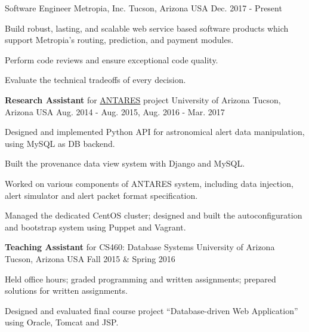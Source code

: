

\begin{cventries}

  \cventry
    {Software Engineer} %
    {Metropia, Inc.} %
    {Tucson, Arizona USA} %
    {Dec. 2017 - Present} %
    {
      \begin{cvitems} %
        \item {Build robust, lasting, and scalable web service based
    software products which support Metropia’s routing,
    prediction, and payment modules.}
       \item {Perform code reviews and ensure exceptional code quality.}
       \item {Evaluate the technical tradeoffs of every decision.}
      \end{cvitems}
    }

  \cventry
    {\textbf{Research Assistant} for \href{https://www.noao.edu/ANTARES/}{ANTARES} project} %
    {University of Arizona} %
    {Tucson, Arizona USA} %
    {Aug. 2014 - Aug. 2015, Aug. 2016 - Mar. 2017} %
    {
      \begin{cvitems} %
      \item {Designed and implemented Python API for astronomical
    alert data manipulation, using MySQL as DB backend.}
      \item {Built the provenance data view system with Django and MySQL.}
      \item {Worked on various components of ANTARES system,
    including data injection, alert simulator and alert packet format specification.}
        \item {Managed the dedicated CentOS cluster; designed and
    built the autoconfiguration and bootstrap 
    system using Puppet and Vagrant.}
      \end{cvitems}
    }

  \cventry
    {\textbf{Teaching Assistant} for CS460: Database Systems}
    {University of Arizona} %
    {Tucson, Arizona USA} %
    {Fall 2015 \& Spring 2016} %
    {
      \begin{cvitems} %
        \item {Held office hours; graded programming and written
    assignments; prepared solutions for written assignments.}
        \item {Designed and evaluated final course project ``Database-driven Web
    Application'' using Oracle, Tomcat and JSP.}
      \end{cvitems}
    }


\end{cventries}
